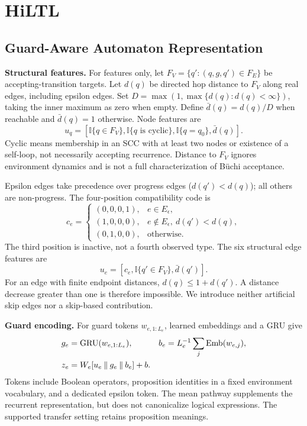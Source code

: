 \documentclass[conference]{IEEEtran}
\newcommand{\ind}{\mathbb{I}}
\newcommand{\concat}{\mathbin{\|}}
\begin{document}
\section{HiLTL}
\label{sec:method}
\subsection{Guard-Aware Automaton Representation}
\label{sec:encoder}
\textbf{Structural features.}
For features only, let $F_V=\{q':(q,g,q')\in F_E\}$ be accepting-transition targets. Let $d(q)$ be directed hop distance to $F_V$ along real edges, including epsilon edges. Set $D=\max(1,\max\{d(q):d(q)<\infty\})$, taking the inner maximum as zero when empty. Define $\bar d(q)=d(q)/D$ when reachable and $\bar d(q)=1$ otherwise. Node features are
\begin{equation}
u_q=[\ind\{q\in F_V\},\ind\{q\text{ is cyclic}\},
\ind\{q=q_0\},\bar d(q)].
\label{eq:nodes}
\end{equation}
Cyclic means membership in an SCC with at least two nodes or existence of a self-loop, not necessarily accepting recurrence. Distance to $F_V$ ignores environment dynamics and is not a full characterization of B\"uchi acceptance.

Epsilon edges take precedence over progress edges ($d(q')<d(q)$); all others are non-progress. The four-position compatibility code is
\[
c_e=\begin{cases}
(0,0,0,1),&e\in E_\epsilon,\\
(1,0,0,0),&e\notin E_\epsilon,\ d(q')<d(q),\\
(0,1,0,0),&\text{otherwise}.
\end{cases}
\]
The third position is inactive, not a fourth observed type. The six structural edge features are
\begin{equation}
u_e=[c_e,\ind\{q'\in F_V\},\bar d(q')].
\label{eq:edges}
\end{equation}
For an edge with finite endpoint distances, $d(q)\leq1+d(q')$. A distance decrease greater than one is therefore impossible. We introduce neither artificial skip edges nor a skip-based contribution.

\textbf{Guard encoding.}
For guard tokens $w_{e,1:L_e}$, learned embeddings and a GRU give
\begin{align}
g_e&=\operatorname{GRU}(w_{e,1:L_e}),&
b_e&=L_e^{-1}\sum_j\operatorname{Emb}(w_{e,j}),\notag\\
z_e&=W_e[u_e\concat g_e\concat b_e]+b.
\label{eq:guard}
\end{align}
Tokens include Boolean operators, proposition identities in a fixed environment vocabulary, and a dedicated epsilon token. The mean pathway supplements the recurrent representation, but does not canonicalize logical expressions. The supported transfer setting retains proposition meanings.
\end{document}
